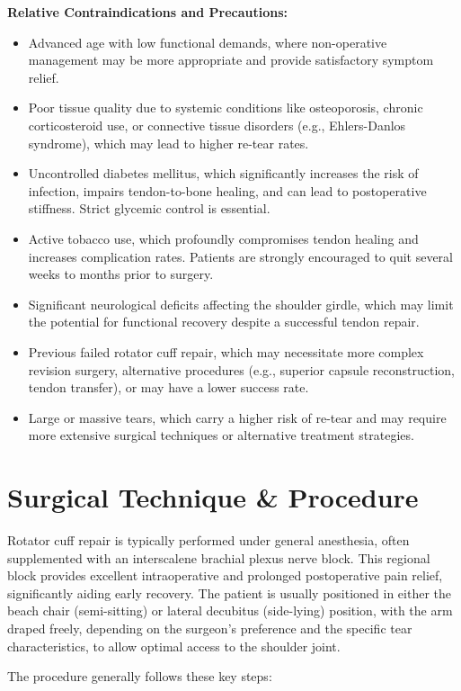 \textbf{Relative Contraindications and Precautions:}
\begin{itemize}
  \item Advanced age with low functional demands, where non-operative management may be more appropriate and provide satisfactory symptom relief.
  \item Poor tissue quality due to systemic conditions like osteoporosis, chronic corticosteroid use, or connective tissue disorders (e.g., Ehlers-Danlos syndrome), which may lead to higher re-tear rates.
  \item Uncontrolled diabetes mellitus, which significantly increases the risk of infection, impairs tendon-to-bone healing, and can lead to postoperative stiffness. Strict glycemic control is essential.
  \item Active tobacco use, which profoundly compromises tendon healing and increases complication rates. Patients are strongly encouraged to quit several weeks to months prior to surgery.
  \item Significant neurological deficits affecting the shoulder girdle, which may limit the potential for functional recovery despite a successful tendon repair.
  \item Previous failed rotator cuff repair, which may necessitate more complex revision surgery, alternative procedures (e.g., superior capsule reconstruction, tendon transfer), or may have a lower success rate.
  \item Large or massive tears, which carry a higher risk of re-tear and may require more extensive surgical techniques or alternative treatment strategies.
\end{itemize}

\section*{Surgical Technique \& Procedure}
Rotator cuff repair is typically performed under general anesthesia, often supplemented with an interscalene brachial plexus nerve block. This regional block provides excellent intraoperative and prolonged postoperative pain relief, significantly aiding early recovery. The patient is usually positioned in either the beach chair (semi-sitting) or lateral decubitus (side-lying) position, with the arm draped freely, depending on the surgeon's preference and the specific tear characteristics, to allow optimal access to the shoulder joint.

The procedure generally follows these key steps:

